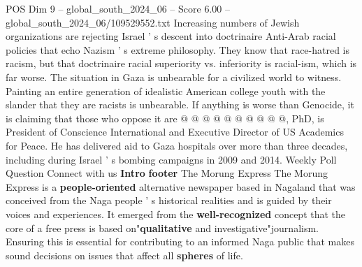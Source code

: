 \begin{textsample}{POS Dim 9 – global\_south\_2024\_06 – Score 6.00 – global\_south\_2024\_06/109529552.txt}
Increasing numbers of Jewish organizations are rejecting Israel ' s descent into doctrinaire Anti-Arab racial policies that echo Nazism ' s extreme philosophy.
They know that race-hatred is racism, but that doctrinaire racial superiority vs. inferiority is racial-ism, which is far worse.
The situation in Gaza is unbearable for a civilized world to witness.
Painting an entire generation of idealistic American college youth with the slander that they are racists is unbearable.
If anything is worse than Genocide, it is claiming that those who oppose it are @ @ @ @ @ @ @ @ @ @, PhD, is President of Conscience International and Executive Director of US Academics for Peace.
He has delivered aid to Gaza hospitals over more than three decades, including during Israel ' s bombing campaigns in 2009 and 2014.
Weekly Poll Question Connect with us \textbf{Intro} \textbf{footer} The Morung Express The Morung Express is a \textbf{people-oriented} alternative newspaper based in Nagaland that was conceived from the Naga people ' s historical realities and is guided by their voices and experiences.
It emerged from the \textbf{well-recognized} concept that the core of a free press is based on"\textbf{qualitative} and investigative"journalism.
Ensuring this is essential for contributing to an informed Naga public that makes sound decisions on issues that affect all \textbf{spheres} of life.

\end{textsample}
